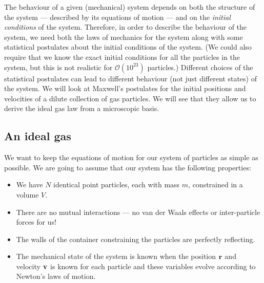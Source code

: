 \documentclass{article}
\begin{document}
The behaviour of a given (mechanical) system depends on both the structure of the system --- described by its equations of motion --- and on the \emph{initial conditions} of the system. Therefore, in order to describe the behaviour of the system, we need both the laws of mechanics for the system along with some statistical postulates about the initial conditions of the system. (We could also require that we know the exact initial conditions for all the particles in the system, but this is not realistic for $\mathcal{O}(10^{23})$ particles.) Different choices of the statistical postulates can lead to different behaviour (not just different states) of the system. We will look at Maxwell's postulates for the initial positions and velocities of a dilute collection of gas particles. We will see that they allow us to derive the ideal gas law from a microscopic basis.

\subsection*{An ideal gas}
We want to keep the equations of motion for our system of particles as simple as possible. We are going to assume   that our system has the following properties:
\begin{itemize}
\item We have $N$ identical  point particles, each with mass $m$, constrained in a volume $V$.
\item There are no mutual interactions --- no van der Waals effects or inter-particle forces for us!
\item The walls of the container constraining the particles are perfectly reflecting.
\item The mechanical state of the system is known when the position $\bf r$ and velocity $\bf v$ is known for each particle and these variables evolve according to Newton's laws of motion.
\end{itemize}
\end{document}
